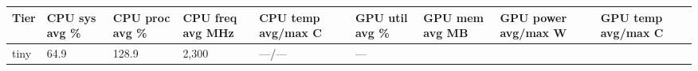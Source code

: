 \documentclass[
  9pt, a4paper, landscape]{article}
\begin{document}
\begin{longtable}[]{@{}lllllllll@{}}
\toprule
\begin{minipage}[b]{0.08\columnwidth}\raggedright
Tier\strut
\end{minipage} & \begin{minipage}[b]{0.08\columnwidth}\raggedright
CPU sys avg \%\strut
\end{minipage} & \begin{minipage}[b]{0.08\columnwidth}\raggedright
CPU proc avg \%\strut
\end{minipage} & \begin{minipage}[b]{0.08\columnwidth}\raggedright
CPU freq avg MHz\strut
\end{minipage} & \begin{minipage}[b]{0.08\columnwidth}\raggedright
CPU temp avg/max C\strut
\end{minipage} & \begin{minipage}[b]{0.08\columnwidth}\raggedright
GPU util avg \%\strut
\end{minipage} & \begin{minipage}[b]{0.08\columnwidth}\raggedright
GPU mem avg MB\strut
\end{minipage} & \begin{minipage}[b]{0.08\columnwidth}\raggedright
GPU power avg/max W\strut
\end{minipage} & \begin{minipage}[b]{0.08\columnwidth}\raggedright
GPU temp avg/max C\strut
\end{minipage}\tabularnewline
\midrule
\endhead
\begin{minipage}[t]{0.08\columnwidth}\raggedright
tiny\strut
\end{minipage} & \begin{minipage}[t]{0.08\columnwidth}\raggedright
64.9\strut
\end{minipage} & \begin{minipage}[t]{0.08\columnwidth}\raggedright
128.9\strut
\end{minipage} & \begin{minipage}[t]{0.08\columnwidth}\raggedright
2,300\strut
\end{minipage} & \begin{minipage}[t]{0.08\columnwidth}\raggedright
---/---\strut
\end{minipage} & \begin{minipage}[t]{0.08\columnwidth}\raggedright
---\strut
\end{minipage} & \begin{minipage}[t]{0.08\columnwidth}\raggedright

\end{minipage}
\end{longtable}
\end{document}
